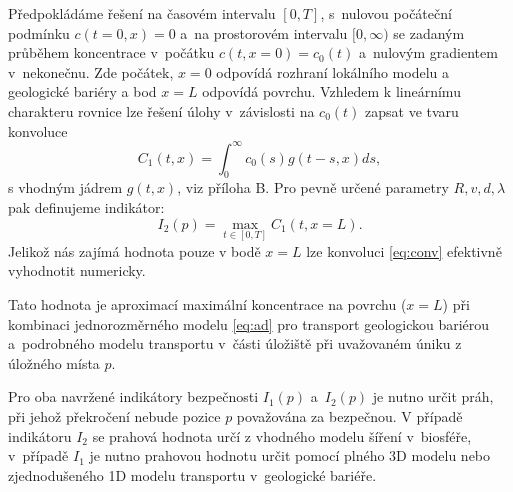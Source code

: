 \documentclass{article}
\def\jb#1{}
\newcommand{\sy}[1]{}
\begin{document}
\sy{Nedovedu si moc predstavit geometrii 3D modelu a uz vubec ne jeho 1D redukci.}
\jb{TODO: Někam zařadit obrázkové schéma modelů na různých škálách a co si ty modely předávají.}

Předpokládáme řešení na časovém intervalu  $[0, T]$, s~nulovou počáteční podmínku $c(t=0, x) = 0$ a~na prostorovém intervalu $[0, \infty)$ se zadaným 
průběhem koncentrace v~počátku $c(t, x=0) = c_0(t)$ a~nulovým gradientem v~nekonečnu. Zde počátek, $x=0$ odpovídá rozhraní lokálního modelu a geologické bariéry a bod $x=L$ odpovídá povrchu.
Vzhledem k lineárnímu charakteru rovnice lze řešení úlohy v~závislosti na $c_0(t)$ zapsat ve tvaru konvoluce
\begin{equation}
    \label{eq:conv}
    C_1(t, x) = \int_{0}^\infty c_0(s) g(t - s, x) ds,
\end{equation}
s  vhodným jádrem $g(t, x)$, viz příloha B. Pro pevně určené parametry $R, v, d, \lambda$ pak definujeme indikátor:
\begin{equation}
    I_2(p) =  \max_{t\in[0, T]} C_1(t, x=L).
\end{equation}
Jelikož nás zajímá hodnota pouze v bodě $x=L$ lze konvoluci \eqref{eq:conv} efektivně vyhodnotit numericky.

Tato hodnota je aproximací maximální koncentrace na povrchu ($x=L$)
při kombinaci jednorozměrného modelu \eqref{eq:ad} pro transport geologickou bariérou a~podrobného 
modelu transportu v~části úložiště při uvažovaném úniku z úložného místa $p$. 

Pro oba navržené indikátory bezpečnosti $I_1(p)$ a~$I_2(p)$ je nutno určit práh, při jehož překročení nebude pozice $p$ považována za bezpečnou. V případě indikátoru $I_2$ se prahová hodnota určí z vhodného modelu šíření  v~biosféře, v~případě $I_1$ je nutno prahovou hodnotu určit pomocí plného 3D modelu nebo zjednodušeného 1D modelu transportu v~geologické bariéře.
\end{document}
